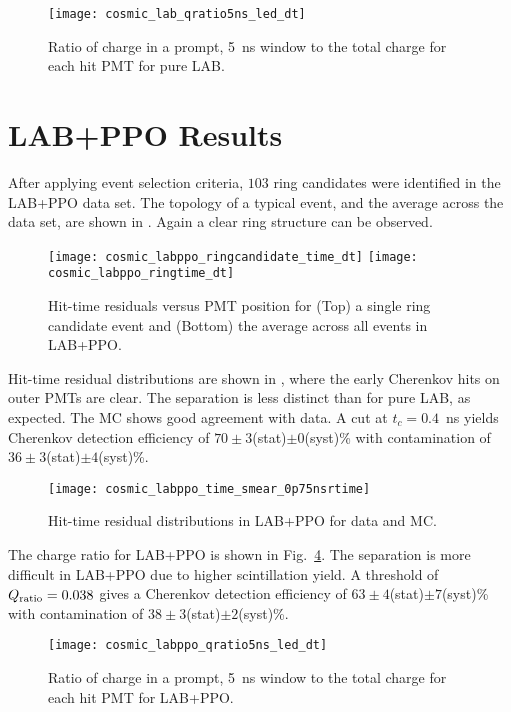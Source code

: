 \begin{figure}
	\centering
	\texttt{[image: cosmic\_lab\_qratio5ns\_led\_dt]}
	\caption{Ratio of charge in a prompt, 5~ns window to the total charge for each hit PMT  for pure LAB.}
	\label{f:labQ}
\end{figure}

\section{LAB+PPO Results}
\label{sec:labppo}

After applying event selection criteria, $103$ ring candidates were identified in the LAB+PPO data set. 
The topology of a typical event, and the average across the data set, are shown in .  Again a clear ring structure can be observed. 
\begin{figure}[!t]
	\centering
	\texttt{[image: cosmic\_labppo\_ringcandidate\_time\_dt]}
	\texttt{[image: cosmic\_labppo\_ringtime\_dt]}	
	\caption{Hit-time residuals versus PMT position for (Top) a single ring candidate event and (Bottom) the average across all events in LAB+PPO.}
	\label{fig:labppo_ring}
\end{figure}
Hit-time residual distributions are shown in , where the early Cherenkov hits on outer PMTs are clear. The separation is less distinct than for pure LAB, as expected. The MC shows good agreement with data.  
A  cut at $ t_c = 0.4$~ns yields Cherenkov detection efficiency of  $70 \pm 3 $(stat)$\pm0$(syst)\% with contamination of $36 \pm 3 $(stat)$\pm4$(syst)\%. 



\begin{figure}
	\centering
	\texttt{[image: cosmic\_labppo\_time\_smear\_0p75nsrtime]}
	\caption{Hit-time residual distributions in LAB+PPO for data and MC.}
	\label{fig:labppo}
\end{figure}

The charge ratio for LAB+PPO is shown in Fig.~\ref{f:labppoQ}.   The separation is more difficult in LAB+PPO due to higher scintillation yield.  A threshold of $Q_{\rm ratio}=0.038$ gives a Cherenkov detection efficiency of $63\pm4$(stat)$\pm7$(syst)\% with contamination of $38\pm3$(stat)$\pm2$(syst)\%.

\begin{figure}
	\centering
	\texttt{[image: cosmic\_labppo\_qratio5ns\_led\_dt]}
	\caption{Ratio of charge in a prompt, 5~ns window to the total charge for each hit PMT for LAB+PPO.}
	\label{f:labppoQ}
\end{figure}

